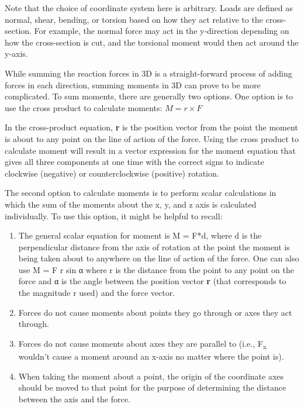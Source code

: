 \documentclass[
  letterpaper,
  DIV=11,
  numbers=noendperiod]{scrreprt}
\theoremstyle{definition}
\theoremstyle{remark}
\begin{document}
Note that the choice of coordinate system here is arbitrary. Loads are
defined as normal, shear, bending, or torsion based on how they act
relative to the cross-section. For example, the normal force may act in
the y-direction depending on how the cross-section is cut, and the
torsional moment would then act around the y-axis.

While summing the reaction forces in 3D is a straight-forward process of
adding forces in each direction, summing moments in 3D can prove to be
more complicated. To sum moments, there are generally two options. One
option is to use the cross product to calculate moments:
\(M=r \times F\)

In the cross-product equation, \textbf{r} is the position vector from
the point the moment is about to any point on the line of action of the
force. Using the cross product to calculate moment will result in a
vector expression for the moment equation that gives all three
components at one time with the correct signs to indicate clockwise
(negative) or counterclockwise (positive) rotation.

The second option to calculate moments is to perform scalar calculations
in which the sum of the moments about the x, y, and z axis is calculated
individually. To use this option, it might be helpful to recall:

\begin{enumerate}
\def\labelenumi{\arabic{enumi}.}
\item
  The general scalar equation for moment is M = F*d, where d is the
  perpendicular distance from the axis of rotation at the point the
  moment is being taken about to anywhere on the line of action of the
  force. One can also use M = F r sin α where r is the distance from the
  point to any point on the force and α is the angle between the
  position vector \textbf{r} (that corresponds to the magnitude r used)
  and the force vector.
\item
  Forces do not cause moments about points they go through or axes they
  act through.
\item
  Forces do not cause moments about axes they are parallel to (i.e.,
  F\textsubscript{x} wouldn't cause a moment around an x-axis no matter
  where the point is).
\item
  When taking the moment about a point, the origin of the coordinate
  axes should be moved to that point for the purpose of determining the
  distance between the axis and the force.
\end{enumerate}
\end{document}
